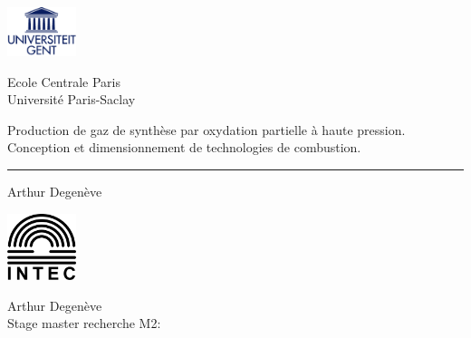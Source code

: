 \documentclass[10pt,a4paper,twoside,frenchb,english]{book}                %
\begin{document}
\graphicspath{{fig/}}

% 
 \thispagestyle{empty}   %
% 
 \noindent
 \begin{minipage}{3cm}%
   \includegraphics*[width=2cm]{UGentlogo}%
 \end{minipage}\hfill
 \begin{minipage}{8cm}
 \raggedleft
 \textsf{Ecole Centrale Paris\\
Université Paris-Saclay}
 \end{minipage}
% 
\bigskip
   \begin{flushleft}
     \Large \textsf{Production de gaz de synthèse par oxydation partielle à haute pression. \\
Conception et dimensionnement de technologies de combustion.}

   \end{flushleft}
 \hrule
% 
 \bigskip
   \LARGE\noindent \textsf{Arthur Degenève} \hfill
 \bigskip
% 
% 
 \normalsize
% 
 \vfill
 \begin{minipage}{2.0cm}%
     \includegraphics*[width=2.0cm]{intec}%
 \end{minipage}\hfill
 \begin{minipage}{9cm}
 \raggedleft
 \textsf{Arthur Degenève \\
 Stage master recherche M2: }
 \end{minipage}



\clearpage{\pagestyle{empty}\cleardoublepage}
\end{document}
